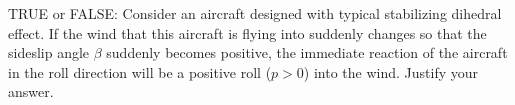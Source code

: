 \begin{question}
    \noindent TRUE or FALSE: Consider an aircraft designed with typical stabilizing dihedral effect. If the wind that this aircraft is flying into suddenly changes so that the sideslip angle $\beta$ suddenly becomes positive, the immediate reaction of the aircraft in the roll direction will be a positive roll ($p > 0$) into the wind. Justify your answer.
\end{question}
